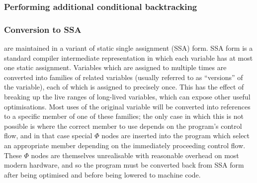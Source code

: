 
\subsubsection{Performing additional conditional backtracking}

\subsubsection{Conversion to SSA}
\label{sect:ssa}

\StateMachines are maintained in a variant of static single assignment (SSA) form.
SSA form is a standard compiler intermediate representation in which each variable has at most one static assignment.
Variables which are assigned to multiple times are converted into families of related variables (usually referred to as ``versions'' of the variable), each of which is assigned to precisely once.
This has the effect of breaking up the live ranges of long-lived variables, which can expose other useful optimisations.
Most uses of the original variable will be converted into references to a specific member of one of these families; the only case in which this is not possible is where the correct member to use depends on the program's control flow, and in that case special $\Phi$ nodes are inserted into the program which select an appropriate member depending on the immediately proceeding control flow.
These $\Phi$ nodes are themselves unrealisable with reasonable overhead on most modern hardware, and so the program must be converted back from SSA form after being optimised and before being lowered to machine code.

